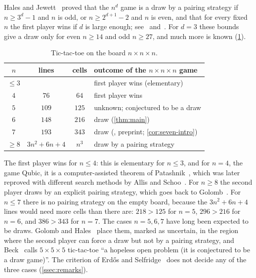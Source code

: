Hales and Jewett~\cite{HalesJewett1963} proved that the $n^d$ game is a draw by a pairing strategy if
$n\ge 3^d-1$ and $n$ is odd, or $n\ge 2^{d+1}-2$ and $n$ is even, and that for every fixed $n$ the first
player wins if $d$ is large enough; see~\cite[p.~300]{ErdosSelfridge1973}
and~\cite[Theorem~2.1 and Corollary~3.4]{Krivelevich2014}. For $d=3$ these bounds give a draw only for
even $n\ge 14$ and odd $n\ge 27$, and much more is known (\cref{tab:known}).

\begin{table}[ht]
\centering\small
\begin{tabular}{@{}cccl@{}}
\toprule
$n$ & lines & cells & outcome of the $n\times n\times n$ game\\
\midrule
$\le 3$ & & & first player wins (elementary)\\
$4$ & $76$ & $64$ & first player wins \cite{Patashnik1980,AllisSchoo1992,Allis1994}\\
$5$ & $109$ & $125$ & unknown; conjectured to be a draw \cite{Beck2008,GolombHales2002}\\
$6$ & $148$ & $216$ & draw (\cref{thm:main})\\
$7$ & $193$ & $343$ & draw (\cite{CainRaymondKallersjo2025}, preprint; \cref{cor:seven-intro})\\
$\ge 8$ & $3n^2+6n+4$ & $n^3$ & draw by a pairing strategy \cite{GolombHales2002,BerlekampConwayGuy2003}\\
\bottomrule
\end{tabular}
\caption{Tic-tac-toe on the board $n\times n\times n$.}
\label{tab:known}
\end{table}

The first player wins for $n\le 4$: this is elementary for $n\le 3$, and for $n=4$, the game Qubic, it
is a computer-assisted theorem of Patashnik~\cite{Patashnik1980}, which was later reproved with
different search methods by Allis and Schoo~\cite{AllisSchoo1992,Allis1994}. For $n\ge 8$ the second
player draws by an explicit pairing strategy, which goes back to
Golomb~\cite{GolombHales2002,BerlekampConwayGuy2003}. For $n\le 7$ there is no pairing strategy on the
empty board, because the $3n^2+6n+4$ lines would need more cells than there are: $218>125$ for $n=5$,
$296>216$ for $n=6$, and $386>343$ for $n=7$. The cases $n=5,6,7$ have long been expected to be draws.
Golomb and Hales~\cite[Table~1]{GolombHales2002} place them, marked as uncertain, in the region where
the second player can force a draw but not by a pairing strategy, and Beck~\cite[p.~1]{Beck2008} calls
$5\times5\times5$ tic-tac-toe ``a hopeless open problem (it is conjectured to be a draw game)''. The
criterion of Erd\H{o}s and Selfridge~\cite{ErdosSelfridge1973} does not decide any of the three cases
(\cref{ssec:remarks}).

